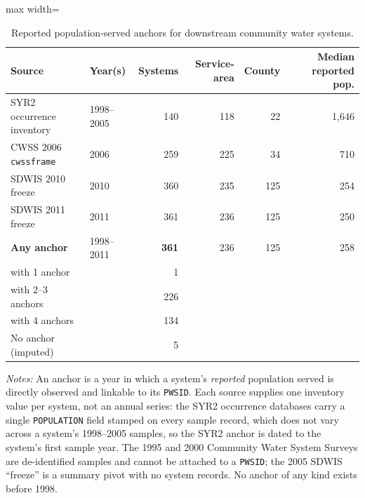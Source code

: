 \begin{table}[ht]
\centering
\caption{Reported population-served anchors for downstream community water systems.}
\label{tab:backcast_anchors}
\begin{adjustbox}{max width=\textwidth}
\begin{tabular}{llrrrr}
\toprule
Source & Year(s) & Systems & Service-area & County & Median reported pop. \\
\midrule
SYR2 occurrence inventory & 1998--2005 & 140 & 118 & 22 & 1,646 \\
CWSS 2006 \texttt{cwssframe} & 2006 & 259 & 225 & 34 & 710 \\
SDWIS 2010 freeze & 2010 & 360 & 235 & 125 & 254 \\
SDWIS 2011 freeze & 2011 & 361 & 236 & 125 & 250 \\
\midrule
\textbf{Any anchor} & 1998--2011 & \textbf{361} & 236 & 125 & 258 \\
\quad with 1 anchor & & 1 & & & \\
\quad with 2--3 anchors & & 226 & & & \\
\quad with 4 anchors & & 134 & & & \\
No anchor (imputed) & & 5 & & & \\
\bottomrule
\end{tabular}
\end{adjustbox}
\begin{minipage}{\textwidth}\footnotesize\raggedright
\vspace{0.5em}
\textit{Notes:} An anchor is a year in which a system's \emph{reported} population served is directly observed and linkable to its \texttt{PWSID}. Each source supplies one inventory value per system, not an annual series: the SYR2 occurrence databases carry a single \texttt{POPULATION} field stamped on every sample record, which does not vary across a system's 1998--2005 samples, so the SYR2 anchor is dated to the system's first sample year. The 1995 and 2000 Community Water System Surveys are de-identified samples and cannot be attached to a \texttt{PWSID}; the 2005 SDWIS ``freeze'' is a summary pivot with no system records. No anchor of any kind exists before 1998.
\end{minipage}
\end{table}
